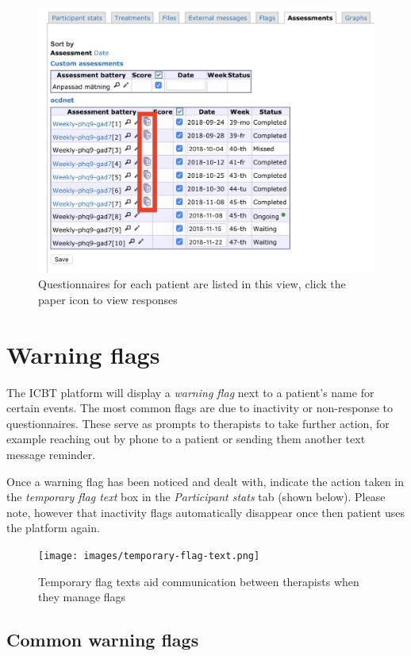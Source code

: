 \documentclass[]{book}
\theoremstyle{definition}
\theoremstyle{definition}
\theoremstyle{definition}
\theoremstyle{remark}
\begin{document}
\begin{figure}
\centering
\includegraphics{images/assessments-list.png}
\caption{Questionnaires for each patient are listed in this view, click
the paper icon to view responses}
\end{figure}

\hypertarget{warning-flags}{%
\section{Warning flags}\label{warning-flags}}

The ICBT platform will display a \emph{warning flag} next to a patient's
name for certain events. The most common flags are due to inactivity or
non-response to questionnaires. These serve as prompts to therapists to
take further action, for example reaching out by phone to a patient or
sending them another text message reminder.

Once a warning flag has been noticed and dealt with, indicate the action
taken in the \emph{temporary flag text} box in the \emph{Participant
stats} tab (shown below). Please note, however that inactivity flags
automatically disappear once then patient uses the platform again.

\begin{figure}
\centering
\texttt{[image: images/temporary-flag-text.png]}
\caption{Temporary flag texts aid communication between therapists when
they manage flags}
\end{figure}

\hypertarget{common-warning-flags}{%
\subsection{Common warning flags}\label{common-warning-flags}}
\end{document}

